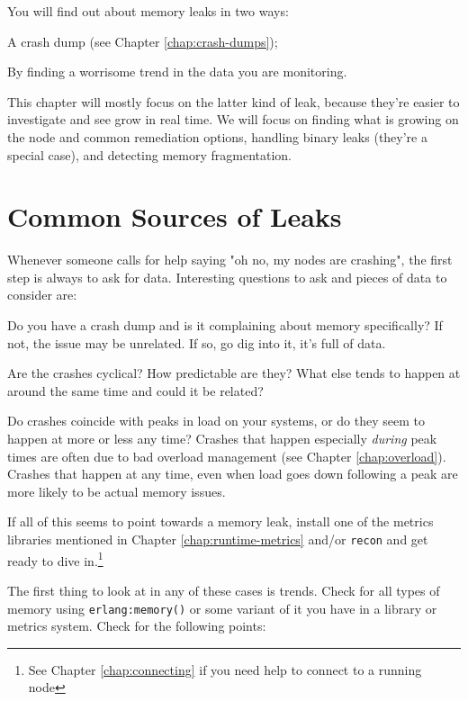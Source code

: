 \documentclass[11pt, oneside]{book}   	%
\newcommand{\otpapp}[1]{\Verb`#1`}
\newcommand{\expression}[1]{\Verb`#1`}
\begin{document}
You will find out about memory leaks in two ways:

\begin{enumerate*}
	\item A crash dump (see Chapter \ref{chap:crash-dumps});
	\item By finding a worrisome trend in the data you are monitoring. 
\end{enumerate*}

This chapter will mostly focus on the latter kind of leak, because they're easier to investigate and see grow in real time. We will focus on finding what is growing on the node and common remediation options, handling binary leaks (they're a special case), and detecting memory fragmentation. 
\section{Common Sources of Leaks}

Whenever someone calls for help saying "oh no, my nodes are crashing", the first step is always to ask for data. Interesting questions to ask and pieces of data to consider are:

\begin{itemize*}
	\item Do you have a crash dump and is it complaining about memory specifically? If not, the issue may be unrelated. If so, go dig into it, it's full of data.
	\item Are the crashes cyclical? How predictable are they? What else tends to happen at around the same time and could it be related?
	\item Do crashes coincide with peaks in load on your systems, or do they seem to happen at more or less any time? Crashes that happen especially \emph{during} peak times are often due to bad overload management (see Chapter \ref{chap:overload}). Crashes that happen at any time, even when load goes down following a peak are more likely to be actual memory issues.
\end{itemize*}

If all of this seems to point towards a memory leak, install one of the metrics libraries mentioned in Chapter \ref{chap:runtime-metrics} and/or \otpapp{recon} and get ready to dive in.\footnote{See Chapter \ref{chap:connecting} if you need help to connect to a running node}

The first thing to look at in any of these cases is trends. Check for all types of memory using \expression{erlang:memory()} or some variant of it you have in a library or metrics system. Check for the following points:
\end{document}
